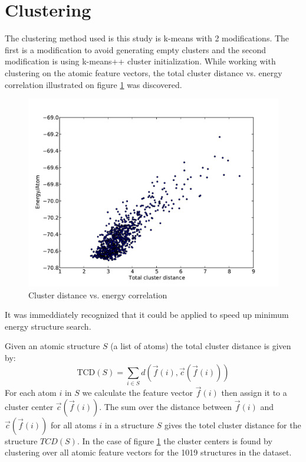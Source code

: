 \documentclass[%
 aps,
 prl,%
 amsmath,amssymb,
 reprint,%
]{revtex4-1}
\begin{document}
\section{Clustering}
The clustering method used is this study is k-means with 2
modifications. The first is a modification to avoid generating empty
clusters \cite{Malay2009} and the second modification is using
k-means++ cluster initialization. While working with clustering on the
atomic feature vectors, the total cluster distance vs. energy correlation
illustrated on figure \ref{fig_corr} was discovered. 

\begin{figure}[h]
    \centering
    \includegraphics[width=1.0\columnwidth]{decoorL2_5_fgen_Ti13O26Ridge_9_11_9_1510066208.pdf}
    \caption{Cluster distance vs. energy correlation}
    \label{fig_corr}
\end{figure}


It was immeddiately recognized that it could be applied to speed up minimum energy structure search.

Given an atomic structure $S$ (a list of atoms) the total cluster distance is given by:
\begin{equation}
\text{TCD}(S) = \sum_{i \in S} d(\vec f(i), \vec c(\vec f(i))) \label{eq3}
\end{equation}
For each atom $i$ in $S$ we calculate the feature vector $\vec f(i)$ then 
assign it to a cluster center $\vec c(\vec f(i))$.   
The sum over the distance between $\vec f(i)$ and $\vec c(\vec f(i))$ for all atoms $i$ in a structure $S$ 
gives the totel cluster distance for the structure $TCD(S)$.
In the case of figure \ref{fig_corr} the cluster centers is found by clustering over all atomic feature vectors 
for the 1019 structures in the dataset. 
\end{document}
